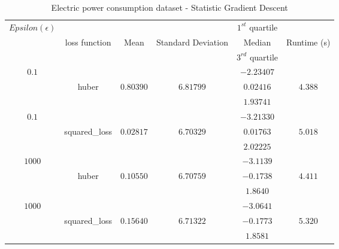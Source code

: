 \begin{table}[p]
\begin{center} 
\begin{tabular}{|c|c|c|c|c|c|}
			\hline \multirow{3}{*}{$Epsilon (\epsilon)$} &&&& $1^{st}$ quartile
			&\\&loss function&Mean&Standard Deviation&Median& Runtime (s)\\&&&& $3^{rd}$
			quartile &\\
			\hline \multirow{3}{*}{$0.1$}&&&&$-2.23407$&\\
			& huber & $0.80390$ & $6.81799$  & $0.02416$ & $4.388$\\
			&&&&$1.93741$& \\
			\hline \multirow{3}{*}{$0.1$}&&&&$-3.21330$ &\\
			& squared\_loss & $0.02817$ & $6.70329$  & $0.01763$ & $5.018$\\
			&&&&	$2.02225$& \\
			\hline \multirow{3}{*}{$1000$}&&&&	$-3.1139$ &\\
			& huber & $0.10550$ & $6.70759$  & $-0.1738$ & $4.411$\\
			&&&&	$1.8640$& \\
			\hline \multirow{3}{*}{$1000$}&&&&	$-3.0641$ &\\
			&squared\_loss & $0.15640$ & $6.71322$  & $-0.1773$ & $5.320$\\
			&&&&	$1.8581$& \\
			\hline

		\end{tabular}
	\end{center}

\caption{Electric power consumption dataset - Statistic Gradient Descent\label{ypmsd:table:ds3sgdresults}}

\end{table}



